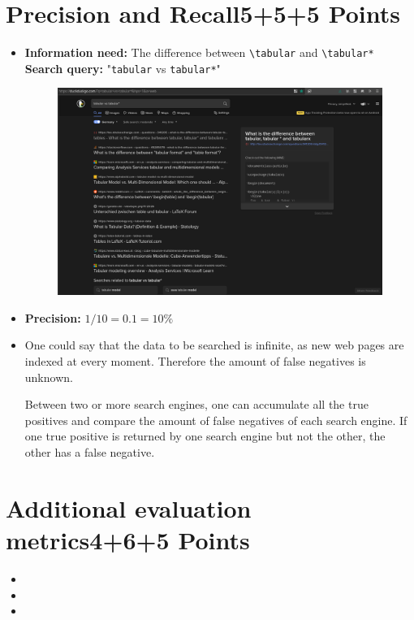 \documentclass[10pt,a4paper]{article}
\begin{document}
\section{\hfill Precision and Recall\hfill 5+5+5 Points}
\begin{itemize}
    \item \textbf{Information need:} The difference between \texttt{\textbackslash tabular} and \texttt{\textbackslash tabular*}\\
        \textbf{Search query:} "\texttt{tabular} vs \texttt{tabular*}"
        \begin{figure}[h]
            \centering
            \includegraphics[width=\linewidth]{e03screenshot}
        \end{figure}
    \item \textbf{Precision:} $1/10=0.1=10\% $
    \item One could say that the data to be searched is infinite, as new web pages are indexed at every moment. Therefore the amount of false negatives is unknown.
    
    Between two or more search engines, one can accumulate all the true positives and compare the amount of false negatives of each search engine. If one true positive is returned by one search engine but not the other, the other has a false negative.
\end{itemize}


\section{\hfill Additional evaluation metrics\hfill 4+6+5 Points}
\begin{itemize}
    \item 
    \item 
    \item 
\end{itemize}
\end{document}
